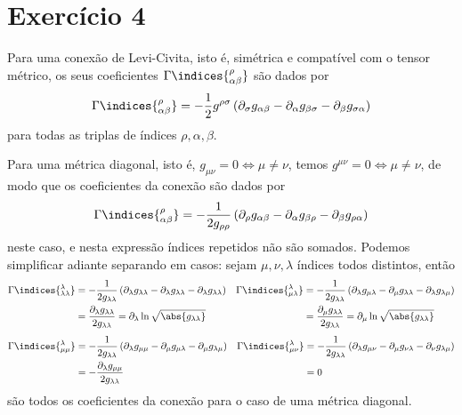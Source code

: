 \section*{Exercício 4}
Para uma conexão de Levi-Civita, isto é, simétrica e compatível com o tensor métrico, os seus coeficientes \(\Gamma\indices{^\rho_{\alpha\beta}}\) são dados por
\begin{equation*}
    \Gamma\indices{^\rho_{\alpha\beta}} = -\frac12 g^{\rho\sigma}\left(\partial_\sigma g_{\alpha \beta} - \partial_{\alpha}g_{\beta \sigma} - \partial_{\beta}g_{\sigma \alpha}\right)
\end{equation*}
para todas as triplas de índices \(\rho, \alpha, \beta\).

Para uma métrica diagonal, isto é, \(g_{\mu\nu} = 0 \iff \mu \neq \nu\), temos \(g^{\mu\nu} = 0 \iff \mu \neq \nu\), de modo que os coeficientes da conexão são dados por
\begin{equation*}
    \Gamma\indices{^\rho_{\alpha\beta}} = -\frac1{2g_{\rho\rho}}\left(\partial_\rho g_{\alpha \beta} - \partial_{\alpha}g_{\beta \rho} - \partial_{\beta}g_{\rho \alpha}\right)
\end{equation*}
neste caso, e nesta expressão índices repetidos não são somados. Podemos simplificar adiante separando em casos: sejam \(\mu, \nu, \lambda\) índices todos distintos, então
\begin{align*}
    \Gamma\indices{^\lambda_{\lambda\lambda}} &= -\frac1{2g_{\lambda\lambda}}\left(\partial_\lambda g_{\lambda \lambda} - \partial_{\lambda}g_{\lambda \lambda} - \partial_{\lambda}g_{\lambda \lambda}\right)&
    \Gamma\indices{^\lambda_{\mu\lambda}} &= -\frac1{2g_{\lambda\lambda}}\left(\partial_\lambda g_{\mu \lambda} - \partial_{\mu}g_{\lambda \lambda} - \partial_{\lambda}g_{\lambda \mu}\right)\\
                                          &= \frac{\partial_{\lambda}g_{\lambda \lambda}}{2g_{\lambda \lambda}} = \partial_{\lambda}\ln{\sqrt{\abs{g_{\lambda \lambda}}}}&
                                          &= \frac{\partial_{\mu}g_{\lambda \lambda}}{2g_{\lambda \lambda}} = \partial_{\mu} \ln{\sqrt{\abs{g_{\lambda \lambda}}}}
\end{align*}
\begin{align*}
    \Gamma\indices{^\lambda_{\mu\mu}} &= -\frac1{2g_{\lambda\lambda}}\left(\partial_\lambda g_{\mu \mu} - \partial_{\mu}g_{\mu \lambda} - \partial_{\mu}g_{\lambda \mu}\right)&
    \Gamma\indices{^\lambda_{\mu\nu}} &= -\frac1{2g_{\lambda\lambda}}\left(\partial_\lambda g_{\mu \nu} - \partial_{\mu}g_{\nu \lambda} - \partial_{\nu}g_{\lambda \mu}\right)\\
                                      &= -\frac{\partial_{\lambda}g_{\mu\mu}}{2g_{\lambda \lambda}}&
                                      &= 0
\end{align*}
são todos os coeficientes da conexão para o caso de uma métrica diagonal.
